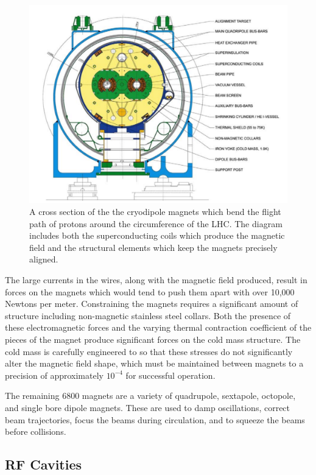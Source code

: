 \begin{figure}
\centering
\includegraphics[width=\fullfig]{figures/dipole_magnet.png}
\caption{A cross section of the the cryodipole magnets which bend the flight path of protons around the circumference of the \ac{LHC}. The diagram includes both the superconducting coils which produce the magnetic field and the structural elements which keep the magnets precisely aligned.}
\label{fig:dipole_magnet}

\end{figure}

The large currents in the wires, along with the magnetic field produced, result in forces on the magnets which would tend to push them apart with over 10,000 Newtons per meter.
Constraining the magnets requires a significant amount of structure including non-magnetic stainless steel collars. 
Both the presence of these electromagnetic forces and the varying thermal contraction coefficient of the pieces of the magnet produce significant forces on the cold mass structure. 
The cold mass is carefully engineered to so that these stresses do not significantly alter the magnetic field shape, which must be maintained between magnets to a precision of approximately $10^{-4}$ for successful operation.

The remaining 6800 magnets are a variety of quadrupole, sextapole, octopole, and single bore dipole magnets.
These are used to damp oscillations, correct beam trajectories, focus the beams during circulation, and to squeeze the beams before collisions.

\subsection{\acs{RF} Cavities}
\label{sec:rfcavity}

